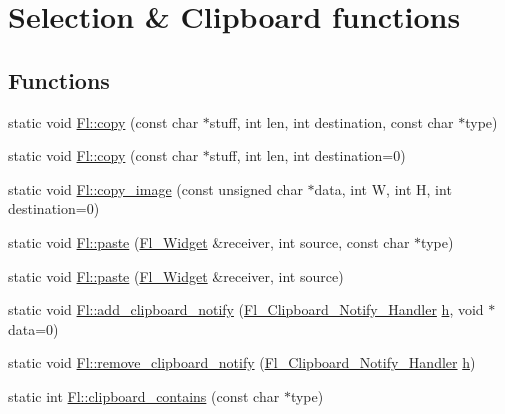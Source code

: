 \hypertarget{group__fl__clipboard}{}\section{Selection \& Clipboard functions}
\label{group__fl__clipboard}
\subsection*{Functions}
\begin{DoxyCompactItemize}
\item 
static void \hyperlink{group__fl__clipboard_ga422fcf99f175df5b81cbe78966a21326}{Fl\+::copy} (const char $\ast$stuff, int len, int destination, const char $\ast$type)
\item 
static void \hyperlink{group__fl__clipboard_gabfc831afe7c4de04c906f82830f54211}{Fl\+::copy} (const char $\ast$stuff, int len, int destination=0)
\item 
static void \hyperlink{group__fl__clipboard_ga84d4249991da2ab1e2f9c7ed47da6394}{Fl\+::copy\+\_\+image} (const unsigned char $\ast$data, int W, int H, int destination=0)
\item 
static void \hyperlink{group__fl__clipboard_ga2d046c74be020156dd5a71888f5a9452}{Fl\+::paste} (\hyperlink{class_fl___widget}{Fl\+\_\+\+Widget} \&receiver, int source, const char $\ast$type)
\item 
static void \hyperlink{group__fl__clipboard_ga2514c08b3b2e43f849090cb636f34ce4}{Fl\+::paste} (\hyperlink{class_fl___widget}{Fl\+\_\+\+Widget} \&receiver, int source)
\item 
static void \hyperlink{group__fl__clipboard_gacb12c3b9a4f45f9ba9b7d8689c42d07c}{Fl\+::add\+\_\+clipboard\+\_\+notify} (\hyperlink{group__callback__functions_gae5e26cbad23960ff7ce4d50d82c74750}{Fl\+\_\+\+Clipboard\+\_\+\+Notify\+\_\+\+Handler} \hyperlink{group__fl__screen_ga0a9410a98136445bacce42b2e3ad4e84}{h}, void $\ast$data=0)
\item 
static void \hyperlink{group__fl__clipboard_ga89d76c03f4fc6669910b7347b71e1762}{Fl\+::remove\+\_\+clipboard\+\_\+notify} (\hyperlink{group__callback__functions_gae5e26cbad23960ff7ce4d50d82c74750}{Fl\+\_\+\+Clipboard\+\_\+\+Notify\+\_\+\+Handler} \hyperlink{group__fl__screen_ga0a9410a98136445bacce42b2e3ad4e84}{h})
\item 
static int \hyperlink{group__fl__clipboard_gae3e2af75e25fd4aa06aa41744cc4e493}{Fl\+::clipboard\+\_\+contains} (const char $\ast$type)
\item 

\end{DoxyCompactItemize}

